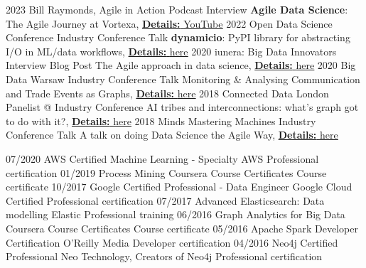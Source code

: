 \documentclass[]{../../../../friggeri-cv}
\begin{document}
\begin{entrylist2}
	\entrytwo
		{\small 2023}
		{\small Bill Raymonds, Agile in Action}
		{\small Podcast Interview}
		{\small \textbf{Agile Data Science}: The Agile Journey at Vortexa, \underline{\textbf{Details:} \href{https://christos-hadjinikolis.github.io//2023/10/31/Agile-In-Action.html}{YouTube}}}
	\entrytwo
		{\small 2022}
		{\small Open Data Science Conference}
		{\small Industry Conference Talk}
		{\small \textbf{dynamicio}: PyPI library for abstracting I/O in ML/data workflows, \underline{\textbf{Details:} \href{https://odsc.com/speakers/dynamicio-a-pandas-i-o-wrapper-why-you-should-start-your-ml-ops-journey-with-wrapping-your-i-o/}{here}}}
	\entrytwo
		{\small 2020}
		{\small iunera: Big Data Innovators}
		{\small Interview Blog Post}
		{\small The Agile approach in data science, \underline{\textbf{Details:} \href{https://www.iunera.com/kraken/interviews/the-agile-approach-in-data-science-explained-by-an-ml-expert/}{here}}}
	\entrytwo
		{\small 2020}
		{\small Big Data Warsaw}
		{\small Industry Conference Talk}
		{\small Monitoring \& Analysing Communication and Trade Events as Graphs, \underline{\textbf{Details:} \href{https://bigdatatechwarsaw.eu/agenda/}{here}}}
	\entrytwo
		{\small 2018}
		{\small Connected Data London}
		{\small Panelist @ Industry Conference}
		{\small AI tribes and interconnections: what's graph got to do with it?, \underline{\textbf{Details:} \href{http://connected-data.london/2018/09/23/ai-tribes-and-interconnections-whats-graph-got-to-do-with-it/}{here}}}
	\entrytwo
		{\small 2018}
		{\small Minds Mastering Machines}
		{\small Industry Conference Talk}
		{\small A talk on doing Data Science the Agile Way, \underline{\textbf{Details:} \href{https://2018.mcubed.london/sessions/data-science-agile-way/}{here}}}
\end{entrylist2}
\begin{entrylist2}
	\entrytwo
		{\small 07/2020}
		{\small AWS Certified Machine Learning - Specialty}
		{\small AWS}
		{\small Professional certification}
	\entrytwo
		{\small 01/2019}
		{\small Process Mining}
		{\small Coursera Course Certificates}
		{\small Course certificate}
	\entrytwo
		{\small 10/2017}
		{\small Google Certified Professional - Data Engineer}
		{\small Google Cloud Certified}
		{\small Professional certification}
	\entrytwo
		{\small 07/2017}
		{\small Advanced Elasticsearch: Data modelling }
		{\small Elastic}
		{\small Professional training}
	\entrytwo
		{\small 06/2016}
		{\small Graph Analytics for Big Data }
		{\small Coursera Course Certificates}
		{\small Course certificate}
	\entrytwo
		{\small 05/2016}
		{\small Apache Spark Developer Certification}
		{\small O'Reilly Media}
		{\small Developer certification}
	\entrytwo
		{\small 04/2016}
		{\small Neo4j Certified Professional}
		{\small Neo Technology, Creators of Neo4j}
		{\small Professional certification}
\end{entrylist2}
\end{document}
